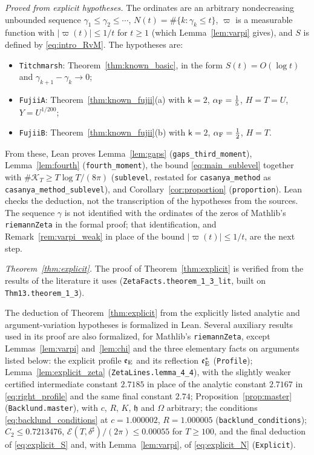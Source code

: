 \documentclass[11pt,a4paper]{article}
\makeatletter
\numberwithin{equation}{section}
\DeclareRobustCommand{\CGref}[1]{\ref{#1}}
\DeclareRobustCommand{\CGeqref}[1]{\eqref{#1}}
\let\CG@origref\ref
\let\CG@origeqref\eqref
\newcommand{\CG@gettip}[1]{\@ifundefined{CGTip@#1}{#1}{\csname CGTip@#1\endcsname}}
\DeclareRobustCommand{\CGref}[1]{\pdftooltip{\CG@origref{#1}}{\CG@gettip{#1}}}
\DeclareRobustCommand{\CGeqref}[1]{\pdftooltip{\CG@origeqref{#1}}{\CG@gettip{#1}}}
\theoremstyle{definition}
\theoremstyle{remark}
\newcommand{\eE}{\mathfrak e_{\rm E}}
\newcommand{\Kc}{\mathcal K}
\makeatother
\begin{document}
\emph{Proved from explicit hypotheses.} The ordinates are an arbitrary nondecreasing unbounded sequence $\gamma_1\le\gamma_2\le\cdots$, $N(t)=\#\{k:\gamma_k\le t\}$, $\varpi$ is a measurable function with $|\varpi(t)|\le1/t$ for $t\ge1$ (which Lemma~\CGref{lem:varpi} gives), and $S$ is defined by \CGeqref{eq:intro_RvM}. The hypotheses are:
\begin{itemize}
\item \texttt{Titchmarsh}: Theorem~\CGref{thm:known_basic}, in the form $S(t)=O(\log t)$ and $\gamma_{k+1}-\gamma_k\to0$;
\item \texttt{FujiiA}: Theorem~\CGref{thm:known_fujii}(a) with $\mathsf k=2$, $\alpha_{\rm F}=\frac15$, $H=T=U$, $Y=U^{1/200}$;
\item \texttt{FujiiB}: Theorem~\CGref{thm:known_fujii}(b) with $\mathsf k=2$, $\alpha_{\rm F}=\frac12$, $H=T$.
\end{itemize}
From these, Lean proves Lemma~\CGref{lem:gaps} (\texttt{gaps\_third\_moment}), Lemma~\CGref{lem:fourth} (\texttt{fourth\_moment}), the bound \CGeqref{eq:main_sublevel} together with $\#\Kc_T\ge T\log T/(8\pi)$ (\texttt{sublevel}, restated for \texttt{casanya\_method} as \texttt{casanya\_method\_sublevel}), and Corollary~\CGref{cor:proportion} (\texttt{proportion}). Lean checks the deduction, not the transcription of the hypotheses from the sources. The sequence $\gamma$ is not identified with the ordinates of the zeros of Mathlib's \texttt{riemannZeta} in the formal proof; that identification, and Remark~\CGref{rem:varpi_weak} in place of the bound $|\varpi(t)|\le1/t$, are the next step.

\emph{Theorem~\CGref{thm:explicit}.} The proof of Theorem~\CGref{thm:explicit} is verified from the results of the literature it uses (\texttt{ZetaFacts.theorem\_1\_3\_lit}, built on \texttt{Thm13.theorem\_1\_3}).

The deduction of Theorem~\CGref{thm:explicit} from the explicitly listed analytic and argument-variation hypotheses is formalized in Lean. Several auxiliary results used in its proof are also formalized, for Mathlib's \texttt{riemannZeta}, except Lemmas~\CGref{lem:varpi} and~\CGref{lem:chi} and the three elementary facts on arguments listed below: the explicit profile $\eE$ and its reflection $\eE^*$ (\texttt{Profile}); Lemma~\CGref{lem:explicit_zeta} (\texttt{ZetaLines.lemma\_4\_4}), with the slightly weaker certified intermediate constant $2.7185$ in place of the analytic constant $2.7167$ in \CGeqref{eq:right_profile} and the same final constant $2.74$; Proposition~\CGref{prop:master} (\texttt{Backlund.master}), with $c$, $R$, $K$, $\mathfrak h$ and $\Omega$ arbitrary; the conditions \CGeqref{eq:backlund_conditions} at $c=1.000002$, $R=1.000005$ (\texttt{backlund\_conditions}); $C_2\le0.7213476$, $\mathcal E(T,\delta^\sharp)/(2\pi)\le0.00055$ for $T\ge100$, and the final deduction of \CGeqref{eq:explicit_S} and, with Lemma~\CGref{lem:varpi}, of \CGeqref{eq:explicit_N} (\texttt{Explicit}).
\end{document}
